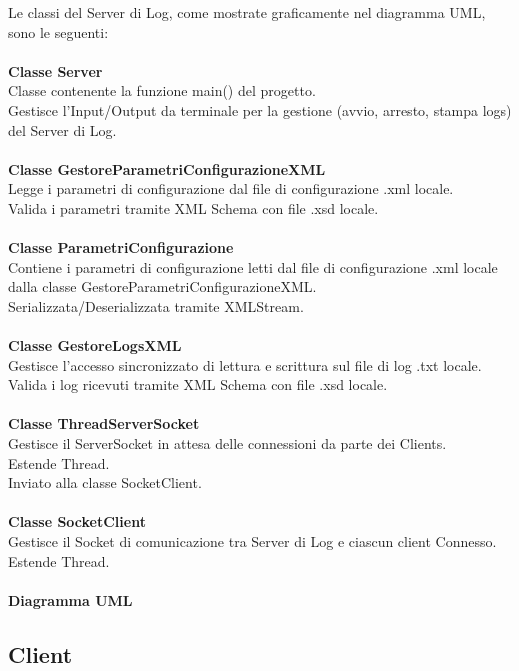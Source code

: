 \documentclass[a4paper, 11pt]{article} %
\begin{document}
Le classi del Server di Log, come mostrate graficamente nel diagramma UML, sono le seguenti:\\
\\
\textbf{Classe Server}\\
Classe contenente la funzione main() del progetto.\\
Gestisce l'Input/Output da terminale per la gestione (avvio, arresto, stampa logs) del Server di Log.\\
\\
\textbf{Classe GestoreParametriConfigurazioneXML}\\
Legge i parametri di configurazione dal file di configurazione .xml locale.\\
Valida i parametri tramite XML Schema con file .xsd locale.\\
\\
\textbf{Classe ParametriConfigurazione}\\
Contiene i parametri di configurazione letti dal file di configurazione .xml locale dalla classe GestoreParametriConfigurazioneXML.\\
Serializzata/Deserializzata tramite XMLStream.\\
\\
\textbf{Classe GestoreLogsXML}\\
Gestisce l'accesso sincronizzato di lettura e scrittura sul file di log .txt locale.\\
Valida i log ricevuti tramite XML Schema con file .xsd locale.\\
\\
\textbf{Classe ThreadServerSocket}\\
Gestisce il ServerSocket in attesa delle connessioni da parte dei Clients.\\
Estende Thread.\\
Inviato alla classe SocketClient.\\
\\
\textbf{Classe SocketClient}\\
Gestisce il Socket di comunicazione tra Server di Log e ciascun client Connesso.\\
Estende Thread.\\
\\
\textbf{Diagramma UML}

\subsection{Client}
\end{document}
